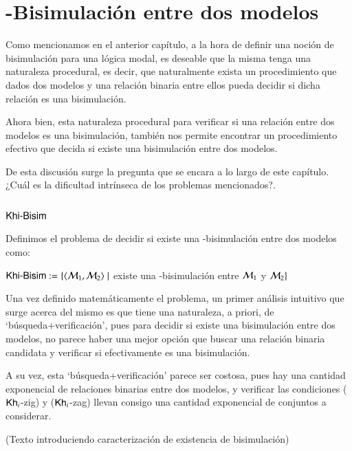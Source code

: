 \chapter{\KHilogic-Bisimulación entre dos modelos}

Como mencionamos en el anterior capítulo, a la hora de definir una noción de bisimulación para una lógica modal, 
es deseable que la misma tenga una naturaleza procedural, es decir, que naturalmente exista un procedimiento que dados dos
modelos y una relación binaria entre ellos pueda decidir si dicha relación es una bisimulación.

Ahora bien, esta naturaleza procedural para verificar si una relación entre dos modelos es una bisimulación,
también nos permite encontrar un procedimiento efectivo que decida si existe una bisimulación entre dos modelos.

De esta discusión surge la pregunta que se encara a lo largo de este capítulo. ¿Cuál es la dificultad intrínseca 
de los problemas mencionados?.

\section{$\rm\textsf{Khi-Bisim}$}

\begin{definicion}
    Definimos el problema de decidir si existe una \KHilogic-bisimulación entre dos modelos como:
    \begin{center}
        $\rm\textsf{Khi-Bisim} := \{\langle \mathcal{M}_1,\mathcal{M}_2 \rangle \mid$ existe una \KHilogic-bisimulación
        entre $\mathcal{M}_1$ y $\mathcal{M}_2\}$
    \end{center}
\end{definicion}

Una vez definido matemáticamente el problema, un primer análisis intuitivo que surge acerca
del mismo es que tiene una naturaleza, a priori, de `búsqueda+verificación', pues
para decidir si existe una bisimulación entre dos modelos, no parece haber una mejor
opción que buscar una relación binaria candidata y verificar si efectivamente es una bisimulación. 

A su vez, esta `búsqueda+verificación' parece ser costosa, pues hay una cantidad exponencial de relaciones binarias
entre dos modelos, y verificar las condiciones ($\mathsf{Kh}_i$-zig) y ($\mathsf{Kh}_i$-zag) llevan consigo una cantidad exponencial
de conjuntos a considerar.

(Texto introduciendo caracterización de existencia de bisimulación)


